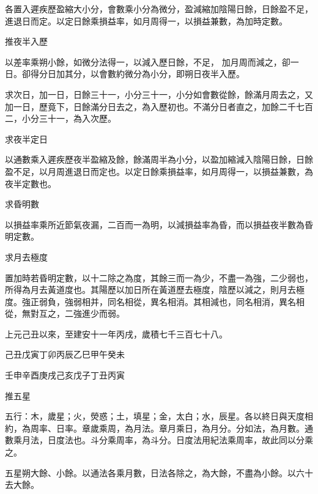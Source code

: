 \begin{pinyinscope}
 各置入遲疾歷盈縮大小分，會數乘小分為微分，盈減縮加陰陽日餘，日餘盈不足，進退日而定。以定日餘乘損益率，如月周得一，以損益兼數，為加時定數。



 推夜半入歷



 以差率乘朔小餘，如微分法得一，以減入歷日餘，不足，
 加月周而減之，卻一日。卻得分日加其分，以會數約微分為小分，即朔日夜半入歷。



 求次日，加一日，日餘三十一，小分三十一，小分如會數從餘，餘滿月周去之，又加一日，歷竟下，日餘滿分日去之，為入歷初也。不滿分日者直之，加餘二千七百二，小分三十一，為入次歷。



 求夜半定日



 以通數乘入遲疾歷夜半盈縮及餘，餘滿周半為小分，以盈加縮減入陰陽日餘，日餘盈不足，以月周進退日而定也。以定日餘乘損益率，如月周得一，以損益兼數，為夜半定數也。



 求昏明數



 以損益率乘所近節氣夜漏，二百而一為明，以減損益率為昏，而以損益夜半數為昏明定數。



 求月去極度



 置加時若昏明定數，以十二除之為度，其餘三而一為少，不盡一為強，二少弱也，所得為月去黃道度也。其陽歷以加日所在黃道歷去極度，陰歷以減之，則月去極度。強正弱負，強弱相并，同名相從，異名相消。其相減也，同名相消，異名相從，無對互之，二強進少而弱。



 上元己丑以來，至建安十一年丙戌，歲積七千三百七十八。



 己丑戊寅丁卯丙辰乙巳甲午癸未



 壬申辛酉庚戌己亥戊子丁丑丙寅



 推五星



 五行：木，歲星；火，熒惑；土，填星；金，太白；水，辰星。各以終日與天度相約，為周率、日率。章歲乘周，為月法。章月乘日，為月分。分如法，為月數。通數乘月法，日度法也。斗分乘周率，為斗分。日度法用紀法乘周率，故此同以分乘之。



 五星朔大餘、小餘。以通法各乘月數，日法各除之，為大餘，不盡為小餘。以六十去大餘。




\end{pinyinscope}
